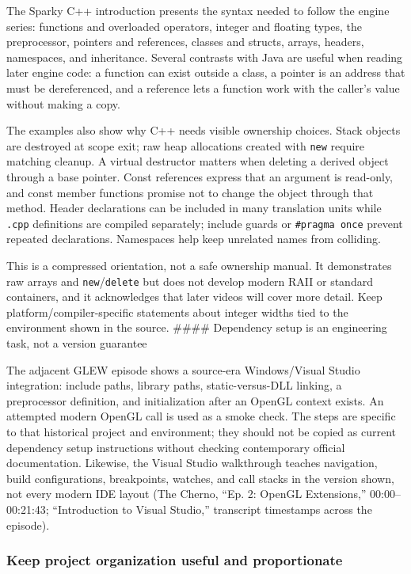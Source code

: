 The Sparky C++ introduction presents the syntax needed to follow the engine series: functions and overloaded operators, integer and floating types, the preprocessor, pointers and references, classes and structs, arrays, headers, namespaces, and inheritance. Several contrasts with Java are useful when reading later engine code: a function can exist outside a class, a pointer is an address that must be dereferenced, and a reference lets a function work with the caller's value without making a copy.

The examples also show why C++ needs visible ownership choices. Stack objects are destroyed at scope exit; raw heap allocations created with \texttt{new} require matching cleanup. A virtual destructor matters when deleting a derived object through a base pointer. Const references express that an argument is read-only, and const member functions promise not to change the object through that method. Header declarations can be included in many translation units while \texttt{.cpp} definitions are compiled separately; include guards or \texttt{\#pragma\ once} prevent repeated declarations. Namespaces help keep unrelated names from colliding.

This is a compressed orientation, not a safe ownership manual. It demonstrates raw arrays and \texttt{new}/\texttt{delete} but does not develop modern RAII or standard containers, and it acknowledges that later videos will cover more detail. Keep platform/compiler-specific statements about integer widths tied to the environment shown in the source. \#\#\#\# Dependency setup is an engineering task, not a version guarantee

The adjacent GLEW episode shows a source-era Windows/Visual Studio integration: include paths, library paths, static-versus-DLL linking, a preprocessor definition, and initialization after an OpenGL context exists. An attempted modern OpenGL call is used as a smoke check. The steps are specific to that historical project and environment; they should not be copied as current dependency setup instructions without checking contemporary official documentation. Likewise, the Visual Studio walkthrough teaches navigation, build configurations, breakpoints, watches, and call stacks in the version shown, not every modern IDE layout (The Cherno, ``Ep. 2: OpenGL Extensions,'' 00:00--00:21:43; ``Introduction to Visual Studio,'' transcript timestamps across the episode).

\subsubsection{Keep project organization useful and proportionate}\label{05-engine-i-ch013-keep-project-organization-useful-and-proportionate}

